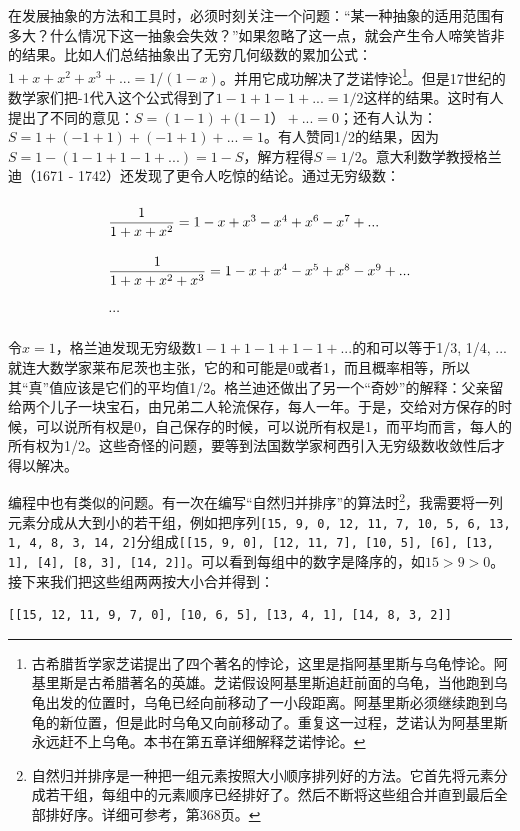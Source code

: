 \documentclass{article}
\begin{document}
在发展抽象的方法和工具时，必须时刻关注一个问题：“某一种抽象的适用范围有多大？什么情况下这一抽象会失效？”如果忽略了这一点，就会产生令人啼笑皆非的结果。比如人们总结抽象出了无穷几何级数的累加公式：$1 + x + x^2 + x^3 + ... = 1/(1-x)$。并用它成功解决了芝诺悖论\footnote{古希腊哲学家芝诺提出了四个著名的悖论，这里是指阿基里斯与乌龟悖论。阿基里斯是古希腊著名的英雄。芝诺假设阿基里斯追赶前面的乌龟，当他跑到乌龟出发的位置时，乌龟已经向前移动了一小段距离。阿基里斯必须继续跑到乌龟的新位置，但是此时乌龟又向前移动了。重复这一过程，芝诺认为阿基里斯永远赶不上乌龟。本书在第五章详细解释芝诺悖论。}。但是17世纪的数学家们把-1代入这个公式得到了$1 - 1 + 1 - 1 + ... = 1/2$这样的结果。这时有人提出了不同的意见：$S = (1 - 1) + (1 - 1）+ ... = 0$；还有人认为：$S = 1 + (-1 + 1) + (-1 + 1) + ... = 1$。有人赞同1/2的结果，因为$S = 1 - (1 - 1 + 1 - 1 + ...) = 1 -S$，解方程得$S = 1/2$。意大利数学教授格兰迪（1671 - 1742）还发现了更令人吃惊的结论。通过无穷级数：

\[
\def\arraystretch{2.2}
\begin{array}{l}
\dfrac{1}{1 + x + x^2} = 1 - x + x^3 - x^4 + x^6 - x^7 + ... \\[2ex]
\dfrac{1}{1 + x + x^2 + x^3} = 1 - x + x^4 - x^5 + x^8 - x^9 + ... \\
...
\end{array}
\]

令$x = 1$，格兰迪发现无穷级数$1 - 1 + 1 - 1 + 1 - 1 + ...$的和可以等于1/3, 1/4, ...就连大数学家莱布尼茨也主张，它的和可能是0或者1，而且概率相等，所以其“真”值应该是它们的平均值1/2。格兰迪还做出了另一个“奇妙”的解释：父亲留给两个儿子一块宝石，由兄弟二人轮流保存，每人一年。于是，交给对方保存的时候，可以说所有权是0，自己保存的时候，可以说所有权是1，而平均而言，每人的所有权为1/2\cite{HanXueTao16}。这些奇怪的问题，要等到法国数学家柯西引入无穷级数收敛性后才得以解决。

编程中也有类似的问题。有一次在编写“自然归并排序”的算法时\footnote{自然归并排序是一种把一组元素按照大小顺序排列好的方法。它首先将元素分成若干组，每组中的元素顺序已经排好了。然后不断将这些组合并直到最后全部排好序。详细可参考\cite{LiuXinyu2017}，第368页。}，我需要将一列元素分成从大到小的若干组，例如把序列\texttt{[15, 9, 0, 12, 11, 7, 10, 5, 6, 13, 1, 4, 8, 3, 14, 2]}分组成\texttt{[[15, 9, 0], [12, 11, 7], [10, 5], [6], [13, 1], [4], [8, 3], [14, 2]]}。可以看到每组中的数字是降序的，如$15 > 9 > 0$。接下来我们把这些组两两按大小合并得到：

\begin{verbatim}
[[15, 12, 11, 9, 7, 0], [10, 6, 5], [13, 4, 1], [14, 8, 3, 2]]
\end{verbatim}
\end{document}
